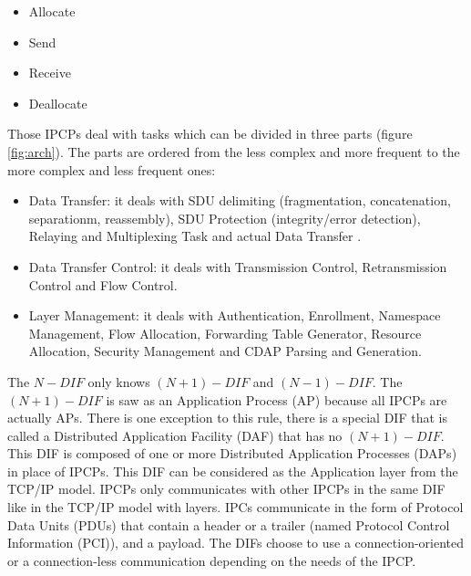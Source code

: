 \documentclass[a4paper]{proc}
\begin{document}
\begin{itemize}
    \item Allocate
    \item Send
    \item Receive
    \item Deallocate
\end{itemize}

Those IPCPs deal with tasks which can be divided in three parts (figure
\ref{fig:arch}).  The parts are ordered from the less complex and more frequent
to the more complex and less frequent ones:

\begin{itemize}
    \item Data Transfer: it deals with SDU delimiting (fragmentation,
        concatenation, separationm, reassembly), SDU Protection (integrity/error
        detection), Relaying and Multiplexing Task and actual Data Transfer
        \cite{irati}.
    \item Data Transfer Control: it deals with Transmission Control,
        Retransmission Control and Flow Control.
    \item Layer Management: it deals with Authentication, Enrollment, Namespace
        Management, Flow Allocation, Forwarding Table Generator, Resource
        Allocation, Security Management and CDAP Parsing and Generation.
\end{itemize}

The $N-DIF$ only knows $(N + 1)-DIF$ and $(N - 1)-DIF$\@.  The $(N + 1)-DIF$ is
saw as an Application Process (AP) because all IPCPs are actually APs.  There is
one exception to this rule, there is a special DIF that is called a Distributed
Application Facility (DAF) that has no $(N + 1)-DIF$\@.  This DIF is composed of
one or more Distributed Application Processes (DAPs) in place of IPCPs.  This
DIF can be considered as the Application layer from the TCP/IP model.  IPCPs
only communicates with other IPCPs in the same DIF like in the TCP/IP model with
layers.  IPCs communicate in the form of Protocol Data Units (PDUs) that contain
a header or a trailer (named Protocol Control Information (PCI)), and a
payload.\cite{PINS} The DIFs choose to use a connection-oriented or a
connection-less communication depending on the needs of the IPCP\@.
\end{document}
